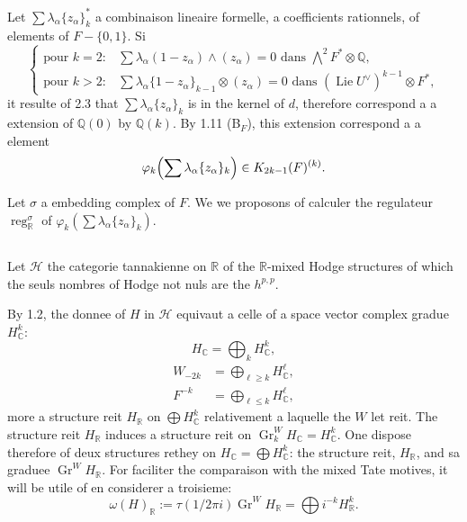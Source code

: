 \documentclass[12pt,a4paper]{article}
\theoremstyle{plain}
\theoremstyle{definition}
\theoremstyle{remark}
\DeclareMathOperator{\reg}{reg}
\DeclareMathOperator{\Lie}{Lie}
\newcommand{\Q}{\mathbb{Q}}
\newcommand{\R}{\mathbb{R}}
\newcommand{\C}{\mathbb{C}}
\begin{document}
{Let $\sum\lambda_\alpha\{z_\alpha\}_k^*$ a combinaison lin{e}aire formelle, {a} coefficients rationnels, of {e}l{e}ments of $F-\{0,1\}$. Si
\begin{equation*}
\begin{cases}
\text{pour }k=2: & \sum\lambda_\alpha(1-z_\alpha)\wedge(z_\alpha)=0\text{ dans }\bigwedge^2F^*\otimes\Q,\\[0.5ex]
\text{pour }k>2: & \sum\lambda_\alpha\{1-z_\alpha\}_{k-1}\otimes(z_\alpha)=0\text{ dans }(\Lie U^\vee)^{k-1}\otimes F^*,
\end{cases}
\end{equation*}
it r{e}sulte of 2.3 that $\sum\lambda_\alpha\{z_\alpha\}_k$ is in the kernel of $d$, therefore correspond {a} a extension of $\Q(0)$ by $\Q(k)$. By 1.11 (B$_F$), this extension correspond {a} a {e}l{e}ment
\begin{equation*}
\varphi_k\Bigl(\sum\lambda_\alpha\{z_\alpha\}_k\Bigr)\in K_{2k-1}(F)^{(k)}.
\end{equation*}

Let $\sigma$ a embedding complex of $F$. We we proposons of calculer the r{e}gulateur $\reg_\R^\sigma$ of $\varphi_k(\sum\lambda_\alpha\{z_\alpha\}_k)$.

\subsection{}

Let $\mathscr{H}$ the cat{e}gorie tannakienne on $\R$ of the $\R$-mixed Hodge structures of which the seuls nombres of Hodge not nuls are the $h^{p,p}$.

By 1.2, the donn{e}e of $H$ in $\mathscr{H}$ {e}quivaut {a} celle of a space vector complex gradu{e} $H_\C^k$:
\begin{equation*}
H_\C = \bigoplus_k H_\C^k,
\end{equation*}
\begin{align*}
W_{-2k} &= \bigoplus_{\ell\geq k}H_\C^\ell,\\
F^{-k} &= \bigoplus_{\ell\leq k}H_\C^\ell,
\end{align*}
more a structure r{e}it $H_\R$ on $\bigoplus H_\C^k$ relativement {a} laquelle the $W$ let r{e}it. The structure r{e}it $H_\R$ induces a structure r{e}it on $\operatorname{Gr}^W_k H_\C = H_\C^k$. One dispose therefore of deux structures r{e}they on $H_\C=\bigoplus H_\C^k$: the structure r{e}it, $H_\R$, and sa gradu{e}e $\operatorname{Gr}^W H_\R$. For faciliter the comparaison with the mixed Tate motives, it will be utile of en consid{e}rer a troisi{e}me:
\begin{equation*}
\omega(H)_\R := \tau(1/2\pi i)\operatorname{Gr}^W H_\R = \bigoplus i^{-k}H_\R^k.
\end{equation*}

}
\end{document}

